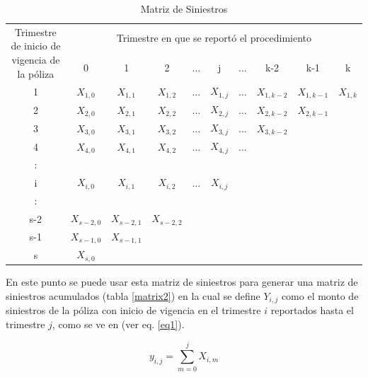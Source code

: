 \documentclass[11pt,twoside,openright,spanish]{report}
\numberwithin{equation}{chapter}
\numberwithin{figure}{chapter}
\numberwithin{table}{chapter}
\begin{document}
	\vspace{1cm}

	\begin{table}[ht]
	\centering
	\begin{tabularx}{\linewidth}{c|ccccccccc}
		\multirow{2}{4cm}{Trimestre de inicio de vigencia de la póliza} & \multicolumn{9}{c}{Trimestre en que se reportó el procedimiento} \\
			& 0  & 1 & 2 & $ \dots $ & j & $\dots $ & k-2 & k-1 &  k \\
		\midrule
		1      &  $X_{1,0}^{}$ & $X_{1,1}^{}$ & $X_{1,2}^{}$ & $ \dots $ & $X_{1,j}^{}$ & $ \dots $ & $X_{1,k-2}^{}$ & $X_{1,k-1}^{}$ & $X_{1,k}^{}$ \\
		2      &  $X_{2,0}^{}$ & $X_{2,1}^{}$ & $X_{2,2}^{}$ & $ \dots $ & $X_{2,j}^{}$ & $ \dots $ & $X_{2,k-2}^{}$ & $X_{2,k-1}^{}$ & \\
		3      &  $X_{3,0}^{}$ & $X_{3,1}^{}$ & $X_{3,2}^{}$ & $ \dots $ & $X_{3,j}^{}$ & $ \dots $ & $X_{3,k-2}^{}$ & & \\
		4      &  $X_{4,0}^{}$ & $X_{4,1}^{}$ & $X_{4,2}^{}$ & $ \dots $ & $X_{4,j}^{}$ & $ \dots $ & & & \\
		:      & & & & & & & & &\\
		i      &  $X_{i,0}^{}$ & $X_{i,1}^{}$ & $X_{i,2}^{}$ & $ \dots $ & $X_{i,j}^{}$ & & & & \\
		:      & & & & & & & & & \\
		s-2      &  $X_{s-2,0}^{}$ & $X_{s-2,1}^{}$ & $X_{s-2,2}^{}$ & & & & & & \\
		s-1      &  $X_{s-1,0}^{}$ & $X_{s-1,1}^{}$ & & & & & & & \\
		s      &  $X_{s,0}^{}$ & & & & & & & & \\
	\end{tabularx}
\caption{Matriz de Siniestros}
\label{matrix1}
	\end{table}

	\vspace{1cm}

	En este punto se puede usar esta matriz de siniestros para generar una matriz de siniestros acumulados (tabla \ref{matrix2}) en la cual se define ${Y}_{i,j}$ como el monto de siniestros de la póliza con inicio de vigencia en el trimestre $i$ reportados hasta el trimestre $j$, como se ve en \citet{PAlvColl} (ver eq. \ref{eq1}).
	
	\begin{equation}
	{y}_{i,j}=\sum _{m=0}^{j}{X}_{i,m}
		\label{eq1}
	\end{equation}
\end{document}
